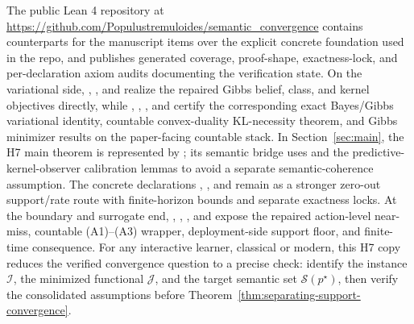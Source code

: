 \documentclass[11pt]{article}
\theoremstyle{definition}
\theoremstyle{remark}
\newcommand{\Scal}{\mathcal{S}}
\begin{document}
The public Lean 4 repository at \url{https://github.com/Populustremuloides/semantic_convergence} contains counterparts for the manuscript items over the explicit concrete foundation used in the repo, and publishes generated coverage, proof-shape, exactness-lock, and per-declaration axiom audits documenting the verification state. On the variational side, , , and  realize the repaired Gibbs belief, class, and kernel objectives directly, while , , , and  certify the corresponding exact Bayes/Gibbs variational identity, countable convex-duality KL-necessity theorem, and Gibbs minimizer results on the paper-facing countable stack. In Section~\ref{sec:main}, the H7 main theorem is represented by ; its semantic bridge uses  and the predictive-kernel-observer calibration lemmas to avoid a separate semantic-coherence assumption. The concrete declarations , , and  remain as a stronger zero-out support/rate route with finite-horizon bounds and separate exactness locks. At the boundary and surrogate end, , , , and  expose the repaired action-level near-miss, countable \textup{(A1)--(A3)} wrapper, deployment-side support floor, and finite-time consequence. For any interactive learner, classical or modern, this H7 copy reduces the verified convergence question to a precise check: identify the instance $\mathcal I$, the minimized functional $\mathcal J$, and the target semantic set $\Scal(p^\star)$, then verify the consolidated assumptions before Theorem~\ref{thm:separating-support-convergence}.



\end{document}
